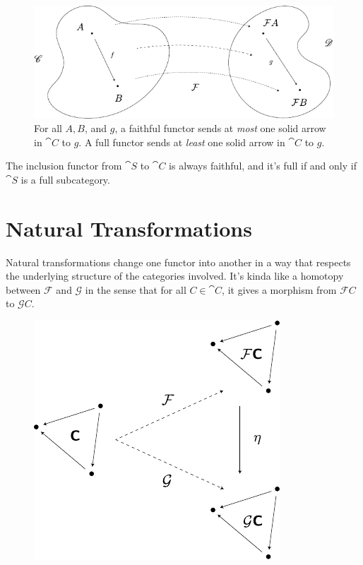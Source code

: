 \documentclass[twoside,10pt]{report}
\begin{document}
\begin{figure}[H]
	\centering
	\includegraphics[scale=1]{fig/faith-full.pdf}
	\caption{For all $A, B$, and $g$, a faithful functor sends at \textit{most} one solid arrow in $\cat{C}$ to $g$. A full functor sends at \textit{least} one solid arrow in $\cat{C}$ to $g$.}
\end{figure}

\begin{ex}
The inclusion functor from $\cat{S}$ to $\cat{C}$ is always faithful, and it's full if and only if $\cat{S}$ is a full subcategory.
\end{ex}



\section{Natural Transformations}

Natural transformations change one functor into another in a way that respects the underlying structure of the categories involved. It's kinda like a homotopy between $\mathcal{F}$ and $\mathcal{G}$ in the sense that for all $C \in \cat{C}$, it gives a morphism from $\mathcal{F}C$ to $\mathcal{G}C$.
\begin{figure}[H]
	\centering
	\includegraphics[scale=1]{fig/nat-trans.pdf}
\end{figure}
\end{document}

